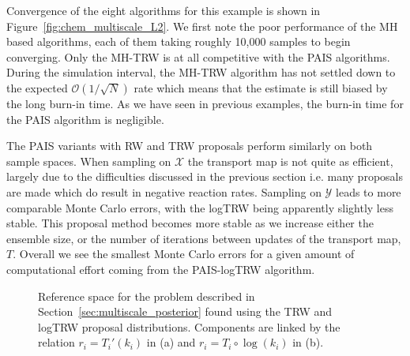 \documentclass[final]{siamltex}
\begin{document}
Convergence of the eight algorithms for this example is shown in Figure~\ref{fig:chem_multiscale_L2}. We first note the poor performance of the MH based algorithms, each of them taking roughly 10,000 samples to begin converging. Only the MH-TRW is at all competitive with the PAIS algorithms. During the simulation interval, the MH-TRW algorithm has not settled down to the expected $\mathcal{O}(1/\sqrt{N})$ rate which means that the estimate is still biased by the long burn-in time. As we have seen in previous examples, the burn-in time for the PAIS algorithm is negligible.

The PAIS variants with RW and TRW proposals perform similarly on both sample spaces. When sampling on $\mathcal{X}$ the transport map is not quite as efficient, largely due to the difficulties discussed in the previous section i.e. many proposals are made which do result in negative reaction rates. Sampling on $\mathcal{Y}$ leads to more comparable Monte Carlo errors, with the logTRW being apparently slightly less stable. This proposal method becomes more stable as we increase either the ensemble size, or the number of iterations between updates of the transport map, $T$. Overall we see the smallest Monte Carlo errors for a given amount of computational effort coming from the PAIS-logTRW algorithm.

\begin{figure}[!htb]
\centering
{}
\caption{Reference space for the problem described in Section~\ref{sec:multiscale_posterior} found using the TRW and logTRW proposal distributions. Components are linked by the relation $r_i = T_i'(k_i)$ in (a) and $r_i = T_i\circ\log(k_i)$ in (b).}
\label{fig:chem_reference_spaces}
\end{figure}
\end{document}

